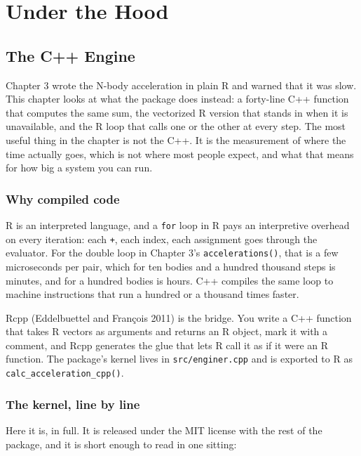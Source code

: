 \documentclass[
  10.5pt,
  letterpaper,
]{scrbook}
\theoremstyle{plain}
\theoremstyle{remark}
\begin{document}
\part{Under the Hood}

\chapter{The C++ Engine}\label{sec-cpp}

Chapter 3 wrote the N-body acceleration in plain R and warned that it
was slow. This chapter looks at what the package does instead: a
forty-line C++ function that computes the same sum, the vectorized R
version that stands in when it is unavailable, and the R loop that calls
one or the other at every step. The most useful thing in the chapter is
not the C++. It is the measurement of where the time actually goes,
which is not where most people expect, and what that means for how big a
system you can run.

\section{Why compiled code}\label{why-compiled-code}

R is an interpreted language, and a \texttt{for} loop in R pays an
interpretive overhead on every iteration: each \texttt{+}, each index,
each assignment goes through the evaluator. For the double loop in
Chapter 3's \texttt{accelerations()}, that is a few microseconds per
pair, which for ten bodies and a hundred thousand steps is minutes, and
for a hundred bodies is hours. C++ compiles the same loop to machine
instructions that run a hundred or a thousand times faster.

Rcpp (Eddelbuettel and François 2011) is the bridge. You write a C++
function that takes R vectors as arguments and returns an R object, mark
it with a comment, and Rcpp generates the glue that lets R call it as if
it were an R function. The package's kernel lives in
\texttt{src/enginer.cpp} and is exported to R as
\texttt{calc\_acceleration\_cpp()}.

\section{The kernel, line by line}\label{the-kernel-line-by-line}

Here it is, in full. It is released under the MIT license with the rest
of the package, and it is short enough to read in one sitting:
\end{document}
